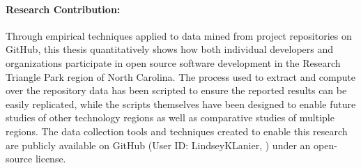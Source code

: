 \paragraph{Research Contribution:} Through empirical techniques applied to data mined from project repositories on GitHub, this thesis quantitatively shows how both individual developers and organizations participate in open source software development in the Research Triangle Park region of North Carolina. The process used to extract and compute over the repository data has been scripted to ensure the reported results can be easily replicated, while the scripts themselves have been designed to enable future studies of other technology regions as well as comparative studies of multiple regions. The data collection tools and techniques created to enable this research are publicly available on GitHub (User ID: LindseyKLanier, \cite{_lindsey_github}) under an open-source license. 
